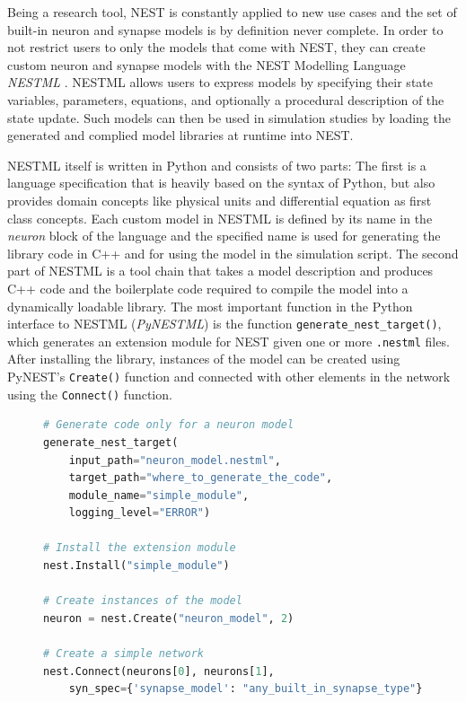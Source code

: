 Being a research tool, NEST is constantly applied to new use cases and the set of built-in neuron and synapse models is by definition never complete. In order to not restrict users to only the models that come with NEST, they can create custom neuron and synapse models with the NEST Modelling Language \emph{NESTML} \citep{plotnikov2016nestml, linssen_charl_a_p_2022_5784175}. NESTML allows users to express models by specifying their state variables, parameters, equations, and optionally a procedural description of the state update. Such models can then be used in simulation studies by loading the generated and complied model libraries at runtime into NEST.

NESTML itself is written in Python and consists of two parts: The first is a language specification that is heavily based on the syntax of Python, but also provides domain concepts like physical units and differential equation as first class concepts. Each custom model in NESTML is defined by its name in the \emph{neuron} block of the language and the specified name is used for generating the library code in C++ and for using the model in the simulation script. The second part of NESTML is a tool chain that takes a model description and produces C++ code and the boilerplate code required to compile the model into a dynamically loadable library. The most important function in the Python interface to NESTML (\emph{PyNESTML}) is the function \texttt{generate\_nest\_target()}, which generates an extension module for NEST given one or more \texttt{.nestml} files. After installing the library, instances of the model can be created using PyNEST's \texttt{Create()} function and connected with other elements in the network using the \texttt{Connect()} function.

\vspace{2em}
\begin{figure}[ht!]
\centering
\begin{lstlisting}[language=Python, label=lst:nestml_without_synapse, caption={Generating extension module code: The \texttt{generate\_nest\_target()} call for only a neuron model. The minimum required parameter of the function is the \texttt{input\_path} that points to the location of the model. Once the code is generated, the built libraries can be loaded into NEST using the \texttt{Install} function by providing the name of the module (\emph{simple\_module}). Once the model is installed in NEST, we can create instances of the model by calling the \texttt{Create()} function with the model name that was given in the \texttt{neuron} block in the NESTML file.}, captionpos=b]
# Generate code only for a neuron model
generate_nest_target(
    input_path="neuron_model.nestml",
    target_path="where_to_generate_the_code",
    module_name="simple_module",
    logging_level="ERROR")

# Install the extension module
nest.Install("simple_module")

# Create instances of the model
neuron = nest.Create("neuron_model", 2)

# Create a simple network
nest.Connect(neurons[0], neurons[1],
    syn_spec={'synapse_model': "any_built_in_synapse_type"})
\end{lstlisting}
\end{figure}

